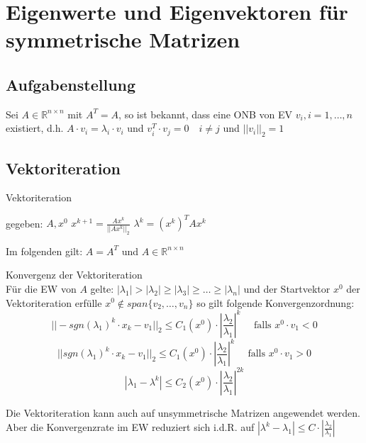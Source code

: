 \section{Eigenwerte und Eigenvektoren für symmetrische Matrizen}
\subsection{Aufgabenstellung}
Sei $A\in \mathbb{R}^{n\times n}$ mit $A^{T}=A$, so ist bekannt, dass eine ONB von EV $v_{i},i=1,\ldots,n$ existiert, d.h.
$A\cdot v_{i}=\lambda_{i}\cdot v_{i}$ und $v_{i}^{T}\cdot v_{j}=0\quad i\not = j$ und $||v_{i}||_{2}=1$

\subsection{Vektoriteration}
\begin{algorithm}
	\caption{Vektoriteration}
	\begin{algorithmic}
		\STATE gegeben: $A,x^{0}$
			\STATE $x^{k+1}=\frac{Ax^{k}}{||Ax^{k}||_{2}}$
			\STATE $\lambda^{k}=(x^{k})^{T}Ax^{k}$
		\ENDFOR
	\end{algorithmic}
\end{algorithm}


Im folgenden gilt: $A=A^{T}$ und $A\in \mathbb{R}^{n\times n}$

\begin{theorem}
	[Satz II.1] Konvergenz der Vektoriteration
	\\
	Für die EW von $A$ gelte: $|\lambda_{1}| > |\lambda_{2}| \geq |\lambda_{3}| \geq \ldots \geq |\lambda_{n}|$
	und der Startvektor $x^{0}$ der Vektoriteration erfülle $x^{0} \not \in span\{v_{2},\ldots,v_{n}\}$ so gilt folgende
	Konvergenzordnung:
	$$||-sgn(\lambda_{1})^{k}\cdot x_{k} - v_{1}||_{2} \leq C_{1}(x^{0})\cdot | \frac{\lambda_{2}}{\lambda_{1}}|^{k}\quad 
	\text{ falls } x^{0}\cdot v_{1}<0$$
	$$||sgn(\lambda_{1})^{k}\cdot x_{k} - v_{1}||_{2} \leq C_{1}(x^{0})\cdot | \frac{\lambda_{2}}{\lambda_{1}}|^{k}\quad 
	\text{ falls } x^{0}\cdot v_{1}>0$$
	$$|\lambda_{1}-\lambda^{k}| \leq C_{2}(x^{0})\cdot | \frac{\lambda_{2}}{\lambda_{1}}|^{2k}$$
\end{theorem}

\begin{remark}
Die Vektoriteration kann auch auf unsymmetrische Matrizen angewendet werden. Aber die Konvergenzrate im EW reduziert sich i.d.R. auf $|\lambda^{k}-\lambda_{1}|\leq C\cdot |\frac{\lambda_{2}}{\lambda_{1}}|$
\end{remark}
